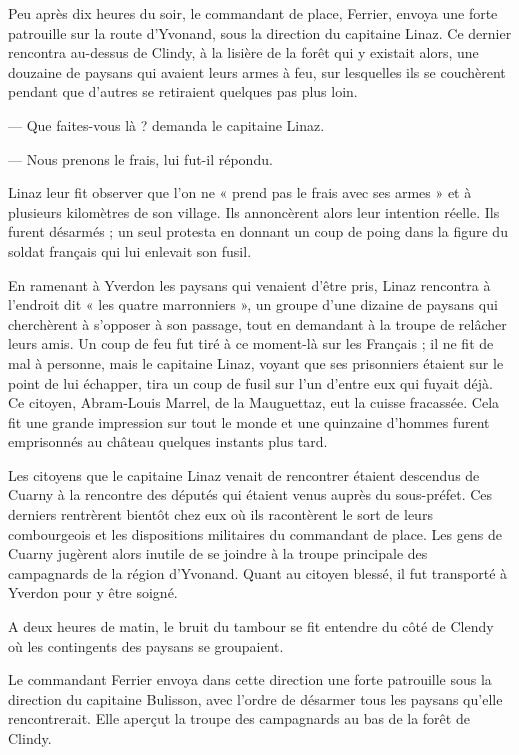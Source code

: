 \documentclass[french,twoside]{book} %
\begin{document}
Peu après dix heures du soir, le commandant de place, Ferrier, envoya une forte patrouille sur la route d’Yvonand, sous la direction du capitaine Linaz. Ce dernier rencontra au-dessus de Clindy, à la lisière de la forêt qui y existait alors, une douzaine de paysans qui avaient leurs armes à feu, sur lesquelles ils se couchèrent pendant que d’autres se retiraient quelques pas plus loin.\par
— Que faites-vous là ? demanda le capitaine Linaz.\par
— Nous prenons le frais, lui fut-il répondu.\par
Linaz leur fit observer que l’on ne « prend pas le frais avec ses armes » et à plusieurs kilomètres de son village. Ils annoncèrent alors leur intention réelle. Ils furent désarmés ; un seul protesta en donnant un coup de poing dans la figure du soldat français qui lui enlevait son fusil.\par
En ramenant à Yverdon les paysans qui venaient d’être pris, Linaz rencontra à l’endroit dit « les quatre marronniers », un groupe d’une dizaine de paysans qui cherchèrent à s’opposer à son passage, tout en demandant à la troupe de relâcher leurs amis. Un coup de feu fut tiré à ce moment-là sur les Français ; il ne fit de mal à personne, mais le capitaine Linaz, voyant que ses prisonniers étaient sur le point de lui échapper, tira un coup de fusil sur l’un d’entre eux qui fuyait déjà. Ce citoyen, Abram-Louis Marrel, de la Mauguettaz, eut la cuisse fracassée. Cela fit une grande impression sur tout le monde et une quinzaine d’hommes furent emprisonnés au château quelques instants plus tard.\par
Les citoyens que le capitaine Linaz venait de rencontrer étaient descendus de Cuarny à la rencontre des députés qui étaient venus auprès du sous-préfet. Ces derniers rentrèrent bientôt chez eux où ils racontèrent le sort de leurs combourgeois et les dispositions militaires du commandant de place. Les gens de Cuarny jugèrent alors inutile de se joindre à la troupe principale des campagnards de la région d’Yvonand. Quant au citoyen blessé, il fut transporté à Yverdon pour y être soigné.\par
A deux heures de matin, le bruit du tambour se fit entendre du côté de Clendy où les contingents des paysans se groupaient.\par
Le commandant Ferrier envoya dans cette direction une forte patrouille sous la direction du capitaine Bulisson, avec l’ordre de désarmer tous les paysans qu’elle rencontrerait. Elle aperçut la troupe des campagnards au bas de la forêt de Clindy.\par
\end{document}
